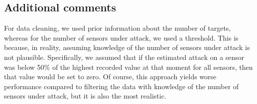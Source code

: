     
    \subsection*{Additional comments}
    For data cleaning, we used prior information about the number of targets, whereas for the number of sensors under attack, we used a threshold. This is because, in reality, assuming knowledge of the number of sensors under attack is not plausible. Specifically, we assumed that if the estimated attack on a sensor was below 50\% of the highest recorded value at that moment for all sensors, then that value would be set to zero. Of course, this approach yields worse performance compared to filtering the data with knowledge of the number of sensors under attack, but it is also the most realistic.
